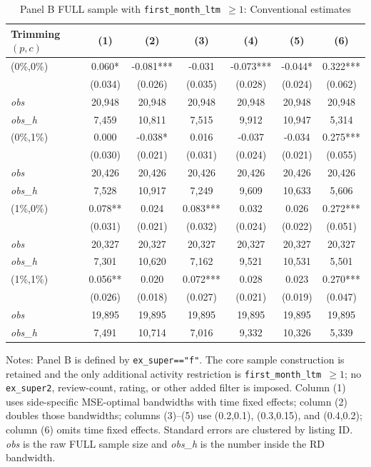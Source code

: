 \begin{table}[!htbp]
\centering
\caption{Panel B FULL sample with \texttt{first\_month\_ltm $\geq 1$}: Conventional estimates}
\label{tab:panel_b_full_first_month_ltm}
\small
\begin{tabular}{lcccccc}
\toprule
Trimming $(p,c)$ & (1) & (2) & (3) & (4) & (5) & (6) \\
\midrule
(0\%,0\%) & 0.060* & -0.081*** & -0.031 & -0.073*** & -0.044* & 0.322*** \\
 & (0.034) & (0.026) & (0.035) & (0.028) & (0.024) & (0.062) \\
\textit{obs} & 20,948 & 20,948 & 20,948 & 20,948 & 20,948 & 20,948 \\
\textit{obs\_h} &  7,459 & 10,811 &  7,515 &  9,912 & 10,947 &  5,314 \\

(0\%,1\%) & 0.000 & -0.038* & 0.016 & -0.037 & -0.034 & 0.275*** \\
 & (0.030) & (0.021) & (0.031) & (0.024) & (0.021) & (0.055) \\
\textit{obs} & 20,426 & 20,426 & 20,426 & 20,426 & 20,426 & 20,426 \\
\textit{obs\_h} &  7,528 & 10,917 &  7,249 &  9,609 & 10,633 &  5,606 \\

(1\%,0\%) & 0.078** & 0.024 & 0.083*** & 0.032 & 0.026 & 0.272*** \\
 & (0.031) & (0.021) & (0.032) & (0.024) & (0.022) & (0.051) \\
\textit{obs} & 20,327 & 20,327 & 20,327 & 20,327 & 20,327 & 20,327 \\
\textit{obs\_h} &  7,301 & 10,620 &  7,162 &  9,521 & 10,531 &  5,501 \\

(1\%,1\%) & 0.056** & 0.020 & 0.072*** & 0.028 & 0.023 & 0.270*** \\
 & (0.026) & (0.018) & (0.027) & (0.021) & (0.019) & (0.047) \\
\textit{obs} & 19,895 & 19,895 & 19,895 & 19,895 & 19,895 & 19,895 \\
\textit{obs\_h} &  7,491 & 10,714 &  7,016 &  9,332 & 10,326 &  5,339 \\

\bottomrule
\end{tabular}
\begin{minipage}{0.98\textwidth}\footnotesize
Notes: Panel B is defined by \texttt{ex\_super=="f"}. The core sample construction is retained and the only additional activity restriction is \texttt{first\_month\_ltm $\geq 1$}; no \texttt{ex\_super2}, review-count, rating, or other added filter is imposed. Column (1) uses side-specific MSE-optimal bandwidths with time fixed effects; column (2) doubles those bandwidths; columns (3)--(5) use (0.2,0.1), (0.3,0.15), and (0.4,0.2); column (6) omits time fixed effects. Standard errors are clustered by listing ID. \textit{obs} is the raw FULL sample size and \textit{obs\_h} is the number inside the RD bandwidth.
\end{minipage}
\end{table}
